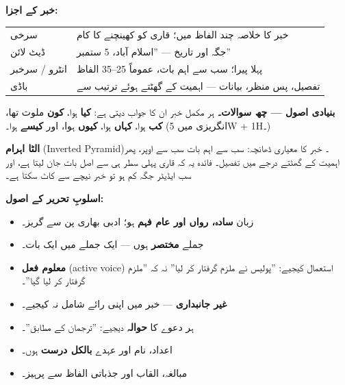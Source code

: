 \begin{hal}
\textbf{خبر کے اجزا:}
\begin{center}
\begin{tabular}{@{}p{3.0cm} p{11.4cm}@{}}
\toprule
سرخی & خبر کا خلاصہ چند الفاظ میں؛ قاری کو کھینچنے کا کام \\
ڈیٹ لائن & جگہ اور تاریخ --- ''اسلام آباد، \textenglish{5} ستمبر'' \\
انٹرو / سرخبر & پہلا پیرا؛ سب سے اہم بات، عموماً \textenglish{25--35} الفاظ \\
باڈی & تفصیل، پس منظر، بیانات --- اہمیت کے گھٹتے ہوئے ترتیب سے \\
\bottomrule
\end{tabular}
\end{center}

\medskip
\textbf{بنیادی اصول --- چھ سوالات۔} ہر مکمل خبر ان کا جواب دیتی ہے:
\textbf{کیا} ہوا، \textbf{کون} ملوث تھا، \textbf{کب} ہوا، \textbf{کہاں} ہوا،
\textbf{کیوں} ہوا، اور \textbf{کیسے} ہوا۔ (انگریزی میں
\textenglish{5W + 1H}۔)

\medskip
\textbf{الٹا اہرام} (\textenglish{Inverted Pyramid})۔ خبر کا معیاری ڈھانچہ:
سب سے اہم بات سب سے اوپر، پھر اہمیت کے گھٹتے درجے میں تفصیل۔ فائدہ یہ کہ قاری
پہلی سطر ہی سے اصل بات جان لیتا ہے، اور سب ایڈیٹر جگہ کم ہو تو خبر نیچے سے کاٹ
سکتا ہے۔

\medskip
\textbf{اسلوبِ تحریر کے اصول:}
\begin{itemize}\setlength{\itemsep}{1pt}
  \item زبان \textbf{سادہ، رواں اور عام فہم} ہو؛ ادبی بھاری پن سے گریز۔
  \item جملے \textbf{مختصر} ہوں --- ایک جملے میں ایک بات۔
  \item \textbf{معلوم فعل} (\textenglish{active voice}) استعمال کیجیے:
        ''پولیس نے ملزم گرفتار کر لیا'' نہ کہ ''ملزم گرفتار کر لیا گیا''۔
  \item \textbf{غیر جانبداری} --- خبر میں اپنی رائے شامل نہ کیجیے۔
  \item ہر دعوے کا \textbf{حوالہ} دیجیے: ''ترجمان کے مطابق''۔
  \item اعداد، نام اور عہدے \textbf{بالکل درست} ہوں۔
  \item مبالغہ، القاب اور جذباتی الفاظ سے پرہیز۔
\end{itemize}

\end{hal}

